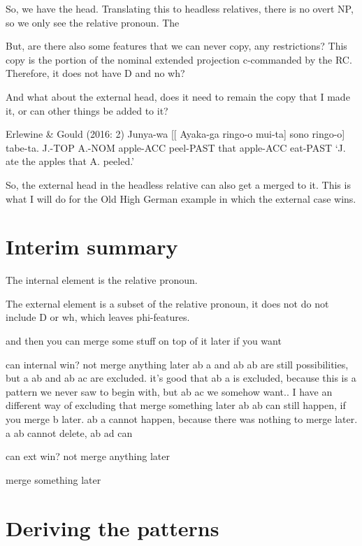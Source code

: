 So, we have the head. Translating this to headless relatives, there is no overt NP, so we only see the relative pronoun. The

But, are there also some features that we can never copy, any restrictions? This copy is the portion of the nominal extended projection c-commanded by the RC. Therefore, it does not have D and no wh?







And what about the external head, does it need to remain the copy that I made it, or can other things be added to it?

Erlewine \& Gould (2016: 2)
Junya-wa [[ Ayaka-ga ringo-o mui-ta] sono ringo-o] tabe-ta.
J.-TOP A.-NOM apple-ACC peel-PAST that apple-ACC eat-PAST
‘J. ate the apples that A. peeled.’

So, the external head in the headless relative can also get a  merged to it. This is what I will do for the Old High German example in which the external case wins.




\section{Interim summary}\label{sec:interim-summary-proposal}

The internal element is the relative pronoun.

The external element is a subset of the relative pronoun, it does not do not include D or wh, which leaves phi-features.

and then you can merge some stuff on top of it later if you want

can internal win?
  not merge anything later
    ab a and ab ab are still possibilities, but a ab and ab ac are excluded. it's good that ab a is excluded, because this is a pattern we never saw to begin with, but ab ac we somehow want.. I have an different way of excluding that
  merge something later
    ab ab can still happen, if you merge b later. ab a cannot happen, because there was nothing to merge later. a ab cannot delete, ab ad can

can ext win?
  not merge anything later

  merge something later





\section{Deriving the patterns}\label{sec:deriving-languages}

